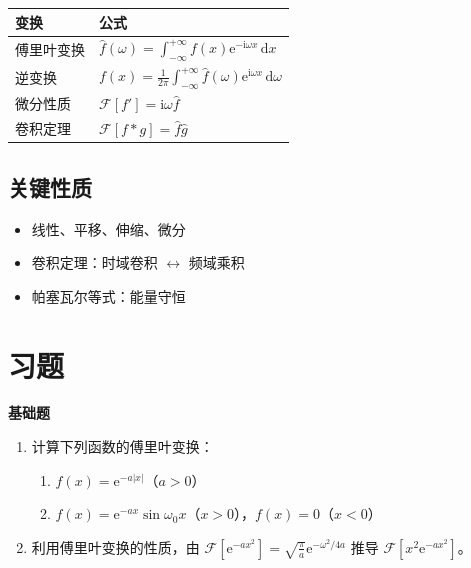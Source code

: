 \begin{table}[htbp]
\centering
\begin{tabular}{ll}
\toprule
\textbf{变换} & \textbf{公式} \\
\midrule
傅里叶变换\index{傅里叶变换} & $\hat{f}(\omega) = \int_{-\infty}^{+\infty} f(x)\mathrm{e}^{-\mathrm{i}\omega x}\,\mathrm{d}x$ \\
逆变换 & $f(x) = \frac{1}{2\pi}\int_{-\infty}^{+\infty} \hat{f}(\omega)\mathrm{e}^{\mathrm{i}\omega x}\,\mathrm{d}\omega$ \\
微分性质 & $\mathcal{F}[f'] = \mathrm{i}\omega\hat{f}$ \\
卷积定理 & $\mathcal{F}[f*g] = \hat{f}\hat{g}$ \\
\bottomrule
\end{tabular}
\end{table}

\subsection{关键性质}

\begin{itemize}
    \item 线性、平移、伸缩、微分
    \item 卷积定理：时域卷积 $\leftrightarrow$ 频域乘积
    \item 帕塞瓦尔等式：能量守恒
\end{itemize}

\section{习题}

\textbf{基础题}

\begin{enumerate}
    \item 计算下列函数的傅里叶变换：
    \begin{enumerate}
        \item $f(x) = \mathrm{e}^{-a|x|}$（$a > 0$）
        \item $f(x) = \mathrm{e}^{-ax}\sin\omega_0 x$（$x > 0$），$f(x) = 0$（$x < 0$）
    \end{enumerate}
    
    \item 利用傅里叶变换的性质，由 $\mathcal{F}[\mathrm{e}^{-ax^2}] = \sqrt{\frac{\pi}{a}}\mathrm{e}^{-\omega^2/4a}$ 推导 $\mathcal{F}[x^2\mathrm{e}^{-ax^2}]$。
\end{enumerate}

